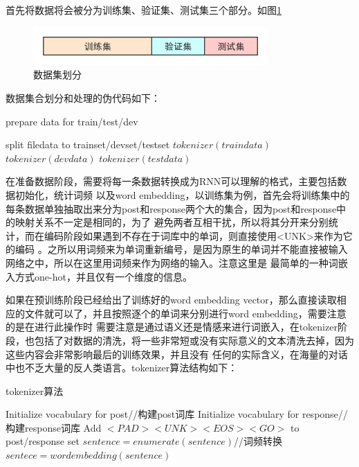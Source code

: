 \documentclass[supercite]{HustGraduPaper}
\theoremstyle{definition}
\begin{document}
首先将数据将会被分为训练集、验证集、测试集三个部分。如图\ref{Fig.data}
\begin{figure}[H] %
  \centering %
  \includegraphics[width=0.8\textwidth]{images/data.png} %
  \caption{数据集划分} %
  \label{Fig.data} %
\end{figure}
数据集合划分和处理的伪代码如下：
\begin{algorithm}
  \caption{prepare data for train/test/dev}
  \label{alg:ppd}
  \begin{algorithmic}
    \State split filedata to trainset/devset/testset
      \State $tokenizer(traindata)$
    \EndFor
      \State $tokenizer(devdata)$
    \EndFor
      \State $tokenizer(testdata)$
    \EndFor
  \end{algorithmic}
\end{algorithm}


在准备数据阶段，需要将每一条数据转换成为RNN可以理解的格式，主要包括数据初始化，统计词频
以及word embedding，以训练集为例，首先会将训练集中的每条数据单独抽取出来分为post和response两个大的集合，因为post和response中的映射关系不一定是相同的，为了
避免两者互相干扰，所以将其分开来分别统计，而在编码阶段如果遇到不存在于词库中的单词，则直接使用<UNK>来作为它的编码
。之所以用词频来为单词重新编号，是因为原生的单词并不能直接被输入网络之中，所以在这里用词频来作为网络的输入。注意这里是
最简单的一种词嵌入方式one-hot，并且仅有一个维度的信息。

如果在预训练阶段已经给出了训练好的word embedding vector，那么直接读取相应的文件就可以了，并且按照逐个的单词来分别进行word embedding，需要注意的是在进行此操作时
需要注意是通过语义还是情感来进行词嵌入，在tokenizer阶段，也包括了对数据的清洗，将一些非常短或没有实际意义的文本清洗去掉，因为这些内容会非常影响最后的训练效果，并且没有
任何的实际含义，在海量的对话中也不乏大量的反人类语言。tokenizer算法结构如下：
\begin{algorithm}
  \caption{tokenizer算法}
  \label{alg:tok}
  \begin{algorithmic}
      \State Initialize vocabulary for post//构建post词库
      \State Initialize vocabulary for response//构建response词库
      \State Add $<PAD> <UNK> <EOS> <GO> $ to post/response set
    \EndFor
        \State $sentence =  enumerate(sentence)$//词频转换
        \State $sentece = wordembedding(sentence)$
    \EndFor
  \end{algorithmic}
\end{algorithm}
\end{document}
